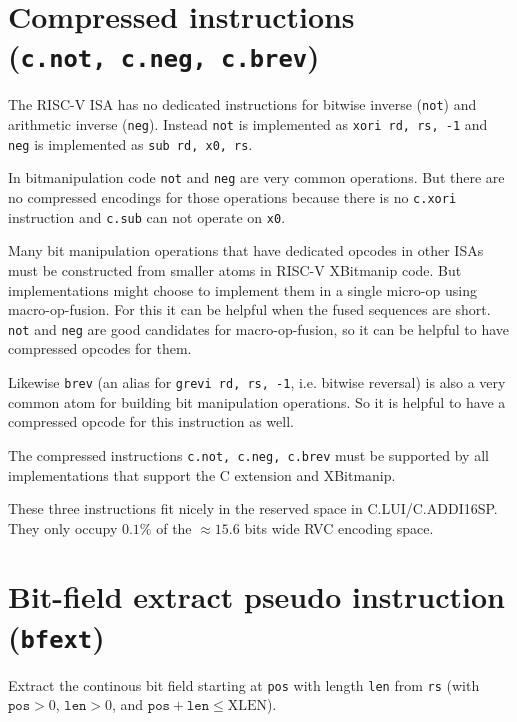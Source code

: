 
\section{Compressed instructions (\texttt{c.not,\ c.neg,\ c.brev})}

The RISC-V ISA has no dedicated instructions for bitwise inverse (\texttt{not})
and arithmetic inverse (\texttt{neg}). Instead \texttt{not} is implemented as
\texttt{xori\ rd,\ rs,\ -1} and \texttt{neg} is implemented as
\texttt{sub\ rd,\ x0,\ rs}.

In bitmanipulation code \texttt{not} and \texttt{neg} are very common operations. But
there are no compressed encodings for those operations because there is no \texttt{c.xori}
instruction and \texttt{c.sub} can not operate on \texttt{x0}.

Many bit manipulation operations that have dedicated opcodes in other ISAs
must be constructed from smaller atoms in RISC-V XBitmanip code. But
implementations might choose to implement them in a single micro-op using
macro-op-fusion. For this it can be helpful when the fused sequences are short.
\texttt{not} and \texttt{neg} are good candidates for macro-op-fusion, so
it can be helpful to have compressed opcodes for them.

Likewise \texttt{brev} (an alias for \texttt{grevi\ rd,\ rs,\ -1}, i.e. bitwise
reversal) is also a very common atom for building bit manipulation operations. So it
is helpful to have a compressed opcode for this instruction as well.

The compressed instructions \texttt{c.not,\ c.neg,\ c.brev} must be supported by
all implementations that support the C extension and XBitmanip.



These three instructions fit nicely in the reserved space in C.LUI/C.ADDI16SP.
They only occupy $0.1\%$ of the $\approx15.6$ bits wide RVC encoding space.


\section{Bit-field extract pseudo instruction ({\tt bfext})}
\label{bfext}

Extract the continous bit field starting at {\tt pos} with length {\tt len}
from {\tt rs} (with $\texttt{pos}>0$, $\texttt{len}>0$, and
$\texttt{pos}+\texttt{len}\le\textrm{XLEN}$).

